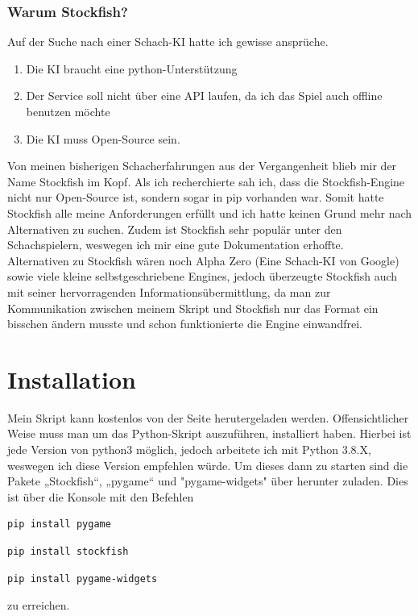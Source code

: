 \documentclass[a4paper, 10pt]{scrartcl}
\begin{document}
\subsubsection{Warum Stockfish?}
Auf der Suche nach einer Schach-KI hatte ich gewisse ansprüche.
\begin{enumerate}
        \item Die KI braucht eine python-Unterstützung
        \item Der Service soll nicht über eine API laufen, da ich das Spiel auch
        offline benutzen möchte
        \item Die KI muss Open-Source sein.
\end{enumerate}
Von meinen bisherigen Schacherfahrungen aus der Vergangenheit blieb mir
der Name Stockfish im Kopf. Als ich recherchierte sah ich, dass die 
Stockfish-Engine nicht nur Open-Source ist, sondern sogar in pip vorhanden war.
Somit hatte Stockfish alle meine Anforderungen erfüllt und ich hatte keinen Grund mehr
nach Alternativen zu suchen.
Zudem ist Stockfish sehr populär unter den Schachspielern, weswegen ich mir eine
gute Dokumentation erhoffte.\\
Alternativen zu Stockfish wären noch Alpha Zero (Eine Schach-KI von Google)
sowie viele kleine selbstgeschriebene Engines, jedoch überzeugte Stockfish auch mit
seiner hervorragenden Informationsübermittlung, da man zur Kommunikation zwischen
meinem Skript und Stockfish nur das Format ein bisschen ändern musste und schon funktionierte
die Engine einwandfrei.  


\section{Installation}
Mein Skript kann kostenlos von der Seite \href{https://github.com/Aetherion-dot/Chess_Python}{\color{blue}{github}} herutergeladen werden.
Offensichtlicher Weise muss man um das Python-Skript auszuführen, \href{https://www.python.org/downloads/}{\color{blue}{python3}} installiert haben.
Hierbei ist jede Version von python3 möglich, jedoch arbeitete ich mit Python 3.8.X, weswegen ich diese Version empfehlen würde.
Um dieses dann zu starten sind die Pakete „Stockfish“, „pygame“ und "pygame-widgets" über \href{https://pypi.org/project/pip/}{\color{blue}{pip}} herunter zuladen.
Dies ist über die Konsole mit den Befehlen
\begin{lstlisting}[language=bash]
        pip install pygame
\end{lstlisting}
\begin{lstlisting}[language=bash]
        pip install stockfish
\end{lstlisting}
\begin{lstlisting}[language=bash]
        pip install pygame-widgets
\end{lstlisting}
zu erreichen.
\end{document}

